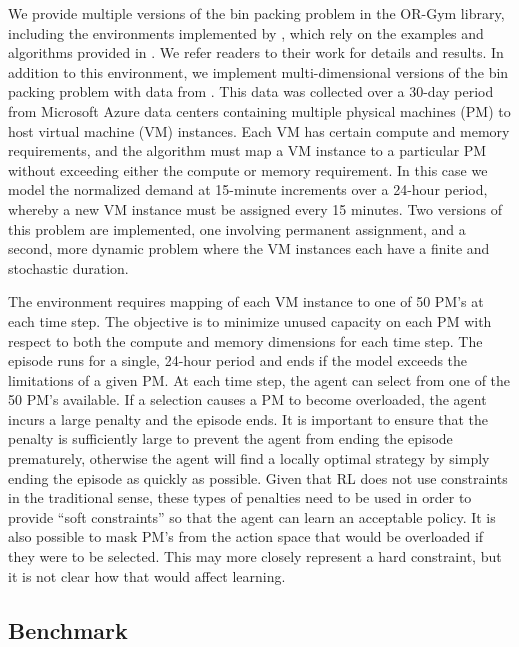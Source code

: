 \documentclass[12pt]{article}
\begin{document}
We provide multiple versions of the bin packing problem in the OR-Gym library, including the environments implemented by \citet{Balaji2019}, which rely on the examples and algorithms provided in \citet{Gupta2012}. 
We refer readers to their work for details and results.
In addition to this environment, we implement multi-dimensional versions of the bin packing problem with data from \citet{Cortez2017}. 
This data was collected over a 30-day period from Microsoft Azure data centers containing multiple physical machines (PM) to host virtual machine (VM) instances.
Each VM has certain compute and memory requirements, and the algorithm must map a VM instance to a particular PM without exceeding either the compute or memory requirement. 
In this case we model the normalized demand at 15-minute increments over a 24-hour period, whereby a new VM instance must be assigned every 15 minutes.
Two versions of this problem are implemented, one involving permanent assignment, and a second, more dynamic problem where the VM instances each have a finite and stochastic duration.

The environment requires mapping of each VM instance to one of 50 PM's at each time step. 
The objective is to minimize unused capacity on each PM with respect to both the compute and memory dimensions for each time step. 
The episode runs for a single, 24-hour period and ends if the model exceeds the limitations of a given PM.
At each time step, the agent can select from one of the 50 PM's available.
If a selection causes a PM to become overloaded, the agent incurs a large penalty and the episode ends.
It is important to ensure that the penalty is sufficiently large to prevent the agent from ending the episode prematurely, otherwise the agent will find a locally optimal strategy by simply ending the episode as quickly as possible.
Given that RL does not use constraints in the traditional sense, these types of penalties need to be used in order to provide ``soft constraints'' so that the agent can learn an acceptable policy.
It is also possible to mask PM's from the action space that would be overloaded if they were to be selected.
This may more closely represent a hard constraint, but it is not clear how that would affect learning.

\subsection{Benchmark}
\end{document}

